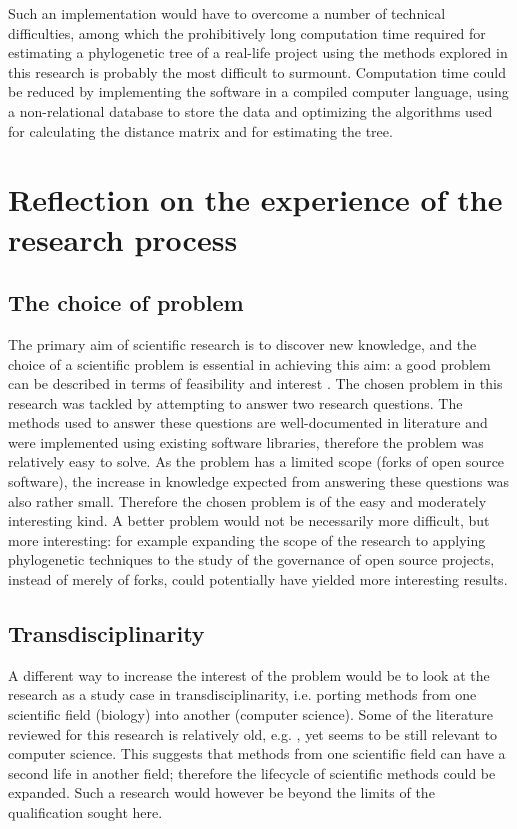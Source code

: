 Such an implementation would have to overcome a number of technical difficulties, among which the prohibitively long computation time required for estimating a phylogenetic tree of a real-life project using the methods explored in this research is probably the most difficult to surmount. Computation time could be reduced by implementing the software in a compiled computer language, using a non-relational database to store the data and optimizing the algorithms used for calculating the distance matrix and for estimating the tree.

\section{Reflection on the experience of the research process}

\subsection{The choice of problem}
The primary aim of scientific research is to discover new knowledge, and the choice of a scientific problem is essential in achieving this aim: a good problem can be described in terms of feasibility and interest \citep{Alon2009a}. The chosen problem in this research was tackled by attempting to answer two research questions. The methods used to answer these questions are well-documented in literature and were implemented using existing software libraries, therefore the problem was relatively easy to solve. As the problem has a limited scope (forks of open source software), the increase in knowledge expected from answering these questions was also rather small. Therefore the chosen problem is of the easy and moderately interesting kind. A better problem would not be necessarily more difficult, but more interesting: for example expanding the scope of the research to applying phylogenetic techniques to the study of the governance of open source projects, instead of merely of forks, could potentially have yielded more interesting results.

\subsection{Transdisciplinarity}
A different way to increase the interest of the problem would be to look at the research as a study case in transdisciplinarity, i.e. porting methods from one scientific field (biology) into another (computer science). Some of the literature reviewed for this research is relatively old, e.g. \citet{Sneath1962a}, yet seems to be still relevant to computer science. This suggests that methods from one scientific field can have a second life in another field; therefore the lifecycle of scientific methods could be expanded. Such a research would however be beyond the limits of the qualification sought here.
